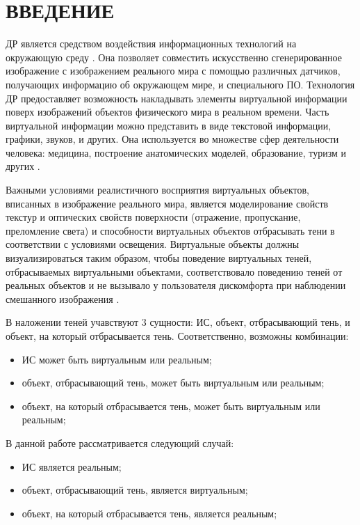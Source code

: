 \chapter*{ВВЕДЕНИЕ}

ДР является средством воздействия информационных технологий на окружающую среду \cite{osti2019real}. Она позволяет совместить искусственно сгенерированное изображение с изображением реального мира с помощью различных датчиков, получающих информацию об окружающем мире, и специального ПО. Технология ДР предоставляет возможность накладывать элементы виртуальной информации поверх изображений объектов физического мира в реальном времени. Часть виртуальной информации можно представить в виде текстовой информации, графики, звуков, и других. Она используется во множестве сфер деятельности человека: медицина, построение анатомических моделей, образование, туризм и других \cite{tech-ar}.

Важными условиями реалистичного восприятия виртуальных объектов, вписанных в изображение реального мира, является моделирование свойств текстур и оптических свойств поверхности (отражение, пропускание, преломление света) и способности виртуальных объектов отбрасывать тени в соответствии с условиями освещения. Виртуальные объекты должны визуализироваться таким образом, чтобы поведение виртуальных теней, отбрасываемых виртуальными объектами, соответствовало поведению теней от реальных объектов и не вызывало у пользователя дискомфорта при наблюдении смешанного изображения \cite{bogdanov}.

В наложении теней учавствуют 3 сущности: ИС, объект, отбрасывающий тень, и объект, на который отбрасывается тень. Соответственно, возможны комбинации:

\begin{itemize}
	\item ИС может быть виртуальным или реальным;
	\item объект, отбрасывающий тень, может быть виртуальным или реальным;
	\item объект, на который отбрасывается тень, может быть виртуальным или реальным;
\end{itemize}

В данной работе рассматривается следующий случай:

\begin{itemize}
	\item ИС является реальным;
	\item объект, отбрасывающий тень, является виртуальным;
	\item объект, на который отбрасывается тень, является реальным;
\end{itemize}

